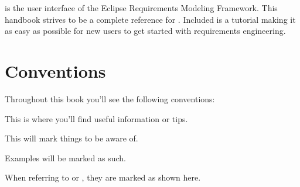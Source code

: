 % 

\pror{} is the user interface of the Eclipse Requirements Modeling Framework.  This handbook strives to be a complete reference for \pror{}.  Included is a tutorial making it as easy as possible for new users to get started with requirements engineering.

\section{Conventions}

Throughout this book you'll see the following conventions:

\begin{info}
This is where you'll find useful information or tips.
\end{info}

\begin{warning}
This will mark things to be aware of.
\end{warning}

\begin{example}
Examples will be marked as such.
\end{example}


When referring to  or , they are marked as shown here.

